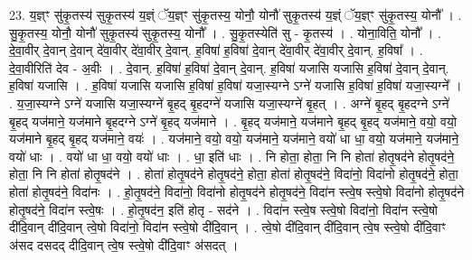 \documentclass[17pt]{extarticle}
\begin{document}
23. य॒ज्ञ्ꣳ सु॑कृ॒तस्य॑ सुकृ॒तस्य॑ य॒ज्ञ्ं ॅय॒ज्ञ्ꣳ सु॑कृ॒तस्य॒ योनौ॒ योनौ॑ सुकृ॒तस्य॑ य॒ज्ञ्ं ॅय॒ज्ञ्ꣳ सु॑कृ॒तस्य॒ योनौ᳚ । . सु॒कृ॒तस्य॒ योनौ॒ योनौ॑ सुकृ॒तस्य॑ सुकृ॒तस्य॒ योनौ᳚ । . सु॒कृ॒तस्येति॑ सु - कृ॒तस्य॑ । . योना॒विति॒ योनौ᳚ । . दे॒वा॒वीर् दे॒वान् दे॒वान् दे॑वा॒वीर् दे॑वा॒वीर् दे॒वान्. ह॒विषा॑ ह॒विषा॑ दे॒वान् दे॑वा॒वीर् दे॑वा॒वीर् दे॒वान्. ह॒विषा᳚ । . दे॒वा॒वीरिति॑ देव - अ॒वीः । . दे॒वान्. ह॒विषा॑ ह॒विषा॑ दे॒वान् दे॒वान्. ह॒विषा॑ यजासि यजासि ह॒विषा॑ दे॒वान् दे॒वान्. ह॒विषा॑ यजासि । . ह॒विषा॑ यजासि यजासि ह॒विषा॑ ह॒विषा॑ यजा॒स्यग्ने ऽग्ने॑ यजासि ह॒विषा॑ ह॒विषा॑ यजा॒स्यग्ने᳚ । . य॒जा॒स्यग्ने ऽग्ने॑ यजासि यजा॒स्यग्ने॑ बृ॒हद् बृ॒हदग्ने॑ यजासि यजा॒स्यग्ने॑ बृ॒हत् । . अग्ने॑ बृ॒हद् बृ॒हदग्ने ऽग्ने॑ बृ॒हद् यज॑माने॒ यज॑माने बृ॒हदग्ने ऽग्ने॑ बृ॒हद् यज॑माने । . बृ॒हद् यज॑माने॒ यज॑माने बृ॒हद् बृ॒हद् यज॑माने॒ वयो॒ वयो॒ यज॑माने बृ॒हद् बृ॒हद् यज॑माने॒ वयः॑ । . यज॑माने॒ वयो॒ वयो॒ यज॑माने॒ यज॑माने॒ वयो॑ धा धा॒ वयो॒ यज॑माने॒ यज॑माने॒ वयो॑ धाः । . वयो॑ धा धा॒ वयो॒ वयो॑ धाः । . धा॒ इति॑ धाः । . नि होता॒ होता॒ नि नि होता॑ होतृ॒षद॑ने होतृ॒षद॑ने॒ होता॒ नि नि होता॑ होतृ॒षद॑ने । . होता॑ होतृ॒षद॑ने होतृ॒षद॑ने॒ होता॒ होता॑ होतृ॒षद॑ने॒ विदा॑नो॒ विदा॑नो होतृ॒षद॑ने॒ होता॒ होता॑ होतृ॒षद॑ने॒ विदा॑नः । . हो॒तृ॒षद॑ने॒ विदा॑नो॒ विदा॑नो होतृ॒षद॑ने होतृ॒षद॑ने॒ विदा॑न स्त्वे॒ष स्त्वे॒षो विदा॑नो होतृ॒षद॑ने होतृ॒षद॑ने॒ विदा॑न स्त्वे॒षः । . हो॒तृ॒षद॑न॒ इति॑ होतृ - सद॑ने । . विदा॑न स्त्वे॒ष स्त्वे॒षो विदा॑नो॒ विदा॑न स्त्वे॒षो दी॑दि॒वान् दी॑दि॒वान् त्वे॒षो विदा॑नो॒ विदा॑न स्त्वे॒षो दी॑दि॒वान् । . त्वे॒षो दी॑दि॒वान् दी॑दि॒वान् त्वे॒ष स्त्वे॒षो दी॑दि॒वाꣳ अ॑सद दसदद् दीदि॒वान् त्वे॒ष स्त्वे॒षो दी॑दि॒वाꣳ अ॑सदत् । \newline
\end{document}
